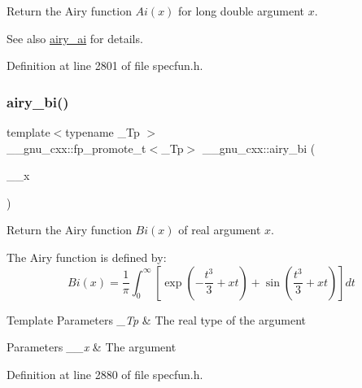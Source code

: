 Return the Airy function $ Ai(x) $ for {\ttfamily long double} argument $ x $.

\begin{DoxySeeAlso}{See also}
\hyperlink{group__gnu__math__spec__func_gac84f8c4ad00ee677ad4d0b785925d983}{airy\+\_\+ai} for details. 
\end{DoxySeeAlso}


Definition at line 2801 of file specfun.\+h.

\mbox{\label{group__gnu__math__spec__func_ga33c172cab7f8e9c99537444c7e30801a}} 
\subsubsection{\texorpdfstring{airy\+\_\+bi()}{airy\_bi()}\hspace{0.1cm}{\footnotesize\ttfamily [1/2]}}
{\footnotesize\ttfamily template$<$typename \+\_\+\+Tp $>$ \\
\+\_\+\+\_\+gnu\+\_\+cxx\+::fp\+\_\+promote\+\_\+t$<$\+\_\+\+Tp$>$ \+\_\+\+\_\+gnu\+\_\+cxx\+::airy\+\_\+bi (\begin{DoxyParamCaption}\item[{\+\_\+\+Tp}]{\+\_\+\+\_\+x }\end{DoxyParamCaption})\hspace{0.3cm}{\ttfamily [inline]}}

Return the Airy function $ Bi(x) $ of real argument $ x $.

The Airy function is defined by\+: \[ Bi(x) = \frac{1}{\pi}\int_0^\infty \left[ \exp \left(-\frac{t^3}{3} + xt \right) + \sin \left(\frac{t^3}{3} + xt \right) \right] dt \]


\begin{DoxyTemplParams}{Template Parameters}
{\em \+\_\+\+Tp} & The real type of the argument \\
\hline
\end{DoxyTemplParams}

\begin{DoxyParams}{Parameters}
{\em \+\_\+\+\_\+x} & The argument \\
\hline
\end{DoxyParams}


Definition at line 2880 of file specfun.\+h.

